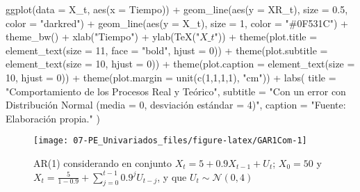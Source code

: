\documentclass[
]{book}
\newenvironment{Shaded}{\begin{snugshade}}{\end{snugshade}}
\newcommand{\AttributeTok}[1]{\textcolor[rgb]{0.77,0.63,0.00}{#1}}
\newcommand{\DecValTok}[1]{\textcolor[rgb]{0.00,0.00,0.81}{#1}}
\newcommand{\FloatTok}[1]{\textcolor[rgb]{0.00,0.00,0.81}{#1}}
\newcommand{\FunctionTok}[1]{\textcolor[rgb]{0.00,0.00,0.00}{#1}}
\newcommand{\NormalTok}[1]{#1}
\newcommand{\SpecialCharTok}[1]{\textcolor[rgb]{0.00,0.00,0.00}{#1}}
\newcommand{\StringTok}[1]{\textcolor[rgb]{0.31,0.60,0.02}{#1}}
\begin{document}
\begin{Shaded}
\begin{Highlighting}[]

\FunctionTok{ggplot}\NormalTok{(}\AttributeTok{data =}\NormalTok{ X\_t, }\FunctionTok{aes}\NormalTok{(}\AttributeTok{x =}\NormalTok{ Tiempo)) }\SpecialCharTok{+}
  \FunctionTok{geom\_line}\NormalTok{(}\FunctionTok{aes}\NormalTok{(}\AttributeTok{y =}\NormalTok{ XR\_t), }\AttributeTok{size =} \FloatTok{0.5}\NormalTok{, }\AttributeTok{color =} \StringTok{"darkred"}\NormalTok{) }\SpecialCharTok{+}
  \FunctionTok{geom\_line}\NormalTok{(}\FunctionTok{aes}\NormalTok{(}\AttributeTok{y =}\NormalTok{ X\_t), }\AttributeTok{size =} \DecValTok{1}\NormalTok{, }\AttributeTok{color =} \StringTok{"\#0F531C"}\NormalTok{) }\SpecialCharTok{+}
  \FunctionTok{theme\_bw}\NormalTok{() }\SpecialCharTok{+} 
  \FunctionTok{xlab}\NormalTok{(}\StringTok{"Tiempo"}\NormalTok{) }\SpecialCharTok{+} 
  \FunctionTok{ylab}\NormalTok{(}\FunctionTok{TeX}\NormalTok{(}\StringTok{"$X\_t$"}\NormalTok{)) }\SpecialCharTok{+} 
  \FunctionTok{theme}\NormalTok{(}\AttributeTok{plot.title =} \FunctionTok{element\_text}\NormalTok{(}\AttributeTok{size =} \DecValTok{11}\NormalTok{, }\AttributeTok{face =} \StringTok{"bold"}\NormalTok{, }\AttributeTok{hjust =} \DecValTok{0}\NormalTok{)) }\SpecialCharTok{+} 
  \FunctionTok{theme}\NormalTok{(}\AttributeTok{plot.subtitle =} \FunctionTok{element\_text}\NormalTok{(}\AttributeTok{size =} \DecValTok{10}\NormalTok{, }\AttributeTok{hjust =} \DecValTok{0}\NormalTok{)) }\SpecialCharTok{+} 
  \FunctionTok{theme}\NormalTok{(}\AttributeTok{plot.caption =} \FunctionTok{element\_text}\NormalTok{(}\AttributeTok{size =} \DecValTok{10}\NormalTok{, }\AttributeTok{hjust =} \DecValTok{0}\NormalTok{)) }\SpecialCharTok{+}
  \FunctionTok{theme}\NormalTok{(}\AttributeTok{plot.margin =} \FunctionTok{unit}\NormalTok{(}\FunctionTok{c}\NormalTok{(}\DecValTok{1}\NormalTok{,}\DecValTok{1}\NormalTok{,}\DecValTok{1}\NormalTok{,}\DecValTok{1}\NormalTok{), }\StringTok{"cm"}\NormalTok{)) }\SpecialCharTok{+}
  \FunctionTok{labs}\NormalTok{(}
    \AttributeTok{title =} \StringTok{"Comportamiento de los Procesos Real y Teórico"}\NormalTok{,}
    \AttributeTok{subtitle =} \StringTok{"Con un error con Distribución Normal (media = 0, desviación estándar = 4)"}\NormalTok{,}
    \AttributeTok{caption =} \StringTok{"Fuente: Elaboración propia."}
\NormalTok{  )}
\end{Highlighting}
\end{Shaded}

\begin{figure}

{\centering \texttt{[image: 07-PE\_Univariados\_files/figure-latex/GAR1Com-1]} 

}

\caption{AR(1) considerando en conjunto $X_t = 5 + 0.9 X_{t-1} + U_t$; $X_0 = 50$ y $X_t = \frac{5}{1 - 0.9} + \sum_{j = 0}^{t-1} 0.9^j U_{t-j}$, y que $U_t \sim \mathcal{N}(0, 4)$}\label{fig:GAR1Com}
\end{figure}
\end{document}

